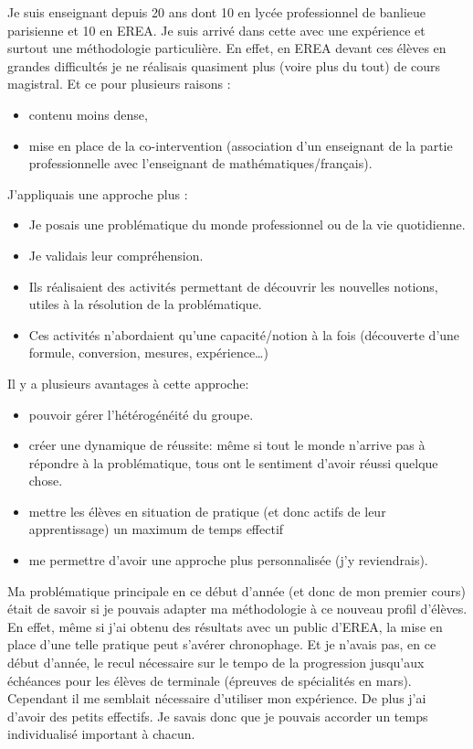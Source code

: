 \documentclass[a4paper,11pt]{article}
\begin{document}
Je suis enseignant depuis 20 ans dont 10 en lycée professionnel de banlieue parisienne et 10 en EREA. Je suis arrivé dans cette  avec une expérience et surtout une méthodologie particulière. En effet, en EREA devant ces élèves en grandes difficultés je ne réalisais quasiment plus (voire plus du tout) de cours magistral. Et ce pour plusieurs raisons :
\begin{itemize}
    \item contenu moins dense,
    \item mise en place de la co-intervention (association d'un enseignant de la partie professionnelle avec l'enseignant de mathématiques/français).
\end{itemize}
J'appliquais une approche plus :
\begin{itemize}
    \item Je posais une problématique du monde professionnel ou de la vie quotidienne.
    \item Je validais leur compréhension.
    \item Ils réalisaient des activités permettant de découvrir les nouvelles notions, utiles à la résolution de la problématique.
    \item Ces activités n'abordaient qu'une capacité/notion à la fois (découverte d'une formule, conversion, mesures, expérience\dots)
\end{itemize}
Il y a plusieurs avantages à cette approche:
\begin{itemize}
    \item pouvoir gérer l'hétérogénéité du groupe.
    \item créer une dynamique de réussite: même si tout le monde n'arrive pas à répondre à la problématique, tous ont le sentiment d'avoir réussi quelque chose.
    \item mettre les élèves en situation de pratique (et donc actifs de leur apprentissage) un maximum de temps effectif
    \item me permettre d'avoir une approche plus personnalisée (j'y reviendrais).
\end{itemize}
Ma problématique principale en ce début d'année (et donc de mon premier cours) était de savoir si je pouvais adapter ma méthodologie à ce nouveau profil d'élèves. En effet, même si j'ai obtenu des résultats avec un public d'EREA, la mise en place d'une telle pratique peut s'avérer chronophage. Et je n'avais pas, en ce début d'année, le recul nécessaire  sur le tempo de la progression jusqu'aux échéances pour les élèves de terminale (épreuves de spécialités en mars). Cependant il me semblait nécessaire d'utiliser mon expérience. De plus j'ai  d'avoir des petits effectifs. Je savais donc que je pouvais accorder un temps individualisé important à chacun.\\
\end{document}

